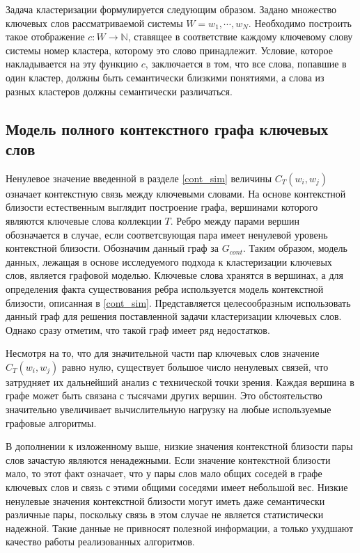 Задача кластеризации формулируется следующим образом. Задано множество ключевых слов рассматриваемой системы $W = {w_1, \cdots, w_N}$. Необходимо построить такое отображение $c: W \rightarrow \mathbb{N}$, ставящее в соответствие каждому ключевому слову системы номер кластера, которому это слово принадлежит. Условие, которое накладывается на эту функцию $c$, заключается в том, что все слова, попавшие в один кластер, должны быть семантически близкими понятиями, а слова из разных кластеров должны семантически различаться.

\subsection{Модель полного контекстного графа ключевых слов} \label{full_cont}
Ненулевое значение введенной в разделе \ref{cont_sim} величины $C_{T}(w_i,w_j)$ означает контекстную связь между ключевыми словами. На основе контекстной близости естественным выглядит построение графа, вершинами которого являются ключевые слова коллекции $T$. Ребро между парами вершин обозначается в случае, если соответсвующая пара имеет ненулевой уровень контекстной близости. Обозначим данный граф за $G_{cont}$. Таким образом, модель данных, лежащая в основе исследуемого подхода к кластеризации ключевых слов, является графовой моделью. Ключевые слова хранятся в вершинах, а для определения факта существования ребра используется модель контекстной близости, описанная в \ref{cont_sim}. Представляется целесообразным использовать данный граф для решения поставленной задачи кластеризации ключевых слов. Однако сразу отметим, что такой граф имеет ряд недостатков.

Несмотря на то, что для значительной части пар ключевых слов значение $C_{T}(w_i, w_j)$ равно нулю, существует большое число ненулевых связей, что затрудняет их дальнейший анализ с технической точки зрения. Каждая вершина в графе может быть связана с тысячами других вершин. Это обстоятельство значительно увеличивает вычислительную нагрузку на любые используемые графовые алгоритмы.

В дополнении к изложенному выше, низкие значения контекстной близости пары слов зачастую являются ненадежными. Если значение контекстной близости мало, то этот факт означает, что у пары слов мало общих соседей в графе ключевых слов и связь с этими общими соседями имеет небольшой вес. Низкие ненулевые значения контекстной близости могут иметь даже семантически различные пары, поскольку связь в этом случае не является статистически надежной. Такие данные не привносят полезной информации, а только ухудшают качество работы реализованных алгоритмов.

